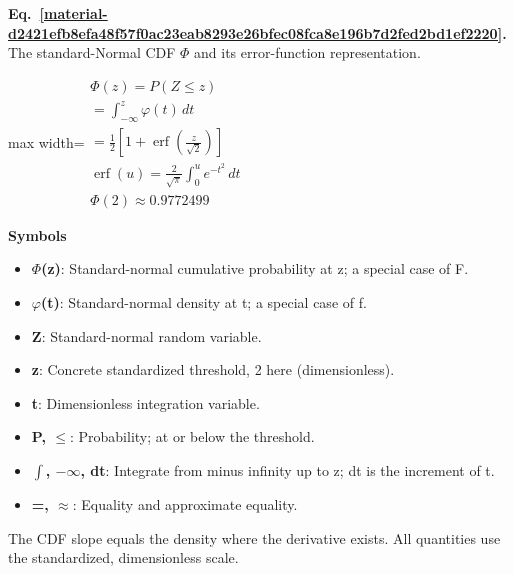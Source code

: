 \documentclass[11pt,a4paper]{article}
\begin{document}
\par\medskip
\begin{samepage}
\label{material-d2421efb8efa48f57f0ac23eab8293e26bfec08fca8e196b7d2fed2bd1ef2220}
\noindent\textbf{Eq.~\ref*{material-d2421efb8efa48f57f0ac23eab8293e26bfec08fca8e196b7d2fed2bd1ef2220}.} The standard-Normal CDF \(\Phi\) and its error-function representation.\par\nopagebreak
\begin{center}\begin{adjustbox}{max width=\linewidth}$\displaystyle \begin{gathered}\Phi(z)=P(Z\le z)\\=\int_{-\infty}^{z}\varphi(t)\,dt\\=\frac12\left[1+\operatorname{erf}\!\left(\frac{z}{\sqrt2}\right)\right]\\\operatorname{erf}(u)=\frac{2}{\sqrt\pi}\int_0^u e^{-t^2}\,dt\\\Phi(2)\approx0.9772499\end{gathered}$\end{adjustbox}\end{center}

\par\noindent\textbf{Symbols}

\begin{itemize}\setlength{\itemsep}{1pt}\setlength{\parsep}{0pt}
\item \textbf{\ensuremath{\Phi}(z)}: Standard-normal cumulative probability at z; a special case of F.
\item \textbf{\ensuremath{\varphi}(t)}: Standard-normal density at t; a special case of f.
\item \textbf{Z}: Standard-normal random variable.
\item \textbf{z}: Concrete standardized threshold, 2 here (dimensionless).
\item \textbf{t}: Dimensionless integration variable.
\item \textbf{P, \ensuremath{\le}}: Probability; at or below the threshold.
\item \textbf{\ensuremath{\int}, \ensuremath{-}\ensuremath{\infty}, dt}: Integrate from minus infinity up to z; dt is the increment of t.
\item \textbf{=, \ensuremath{\approx}}: Equality and approximate equality.
\end{itemize}

The CDF slope equals the density where the derivative exists. All quantities use the standardized, dimensionless scale.


\end{samepage}
\end{document}
